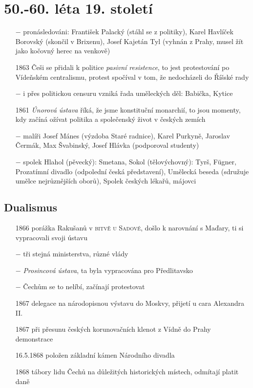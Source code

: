 \documentclass{article}
\begin{document}
\section*{50.-60. léta 19. století}
\begin{itemize}
    \vspace{-0.5em}
    \setlength\itemsep{0.15em}
    \item[$-$] pronásledováni: František Palacký (stáhl se z politiky), Karel Havlíček Borovský (skončil v Brixenu), Josef Kajetán Tyl (vyhnán z Prahy, musel žít jako kočovný herec na venkově)
    \item[1863] Češi se přidali k politice \textit{pasivní resistence}, to jest protestování po Vídeňském centralismu, protest spočíval v tom, že nedocházeli do Říšské rady
    \item[$-$] i přes politickou censuru vzniká řada uměleckých děl: Babička, Kytice
    \item[1861] \textit{Únorová ústava} říká, že jsme konstituční monarchií, to jsou momenty, kdy začíná ožívat politika a společenský život v českých zemích
    \item[$-$] malíři Josef Mánes (výzdoba Staré radnice), Karel Purkyně, Jaroslav Čermák, Max Švabinský, Josef Hlávka (podporoval studenty)
    \item[$-$] spolek Hlahol (pěvecký): Smetana, Sokol (tělovýchovný): Tyrš, Fügner, Prozatímní divadlo (odpolední česká představení), Umělecká beseda (sdružuje umělce nejrůznějších oborů), Spolek českých lékařů, májovci
\end{itemize}

\subsection*{Dualismus}
\begin{itemize}
    \vspace{-0.5em}
    \setlength\itemsep{0.15em}
    \item[1866] porážka Rakušanů v \textsc{bitvě u Sadové}, došlo k narovnání s Maďary, ti si vypracovali svoji ústavu
    \item[$-$] tři stejná ministerstva, různé vlády
    \item[$-$] \textit{Prosincová ústava}, ta byla vypracována pro Předlitavsko
    \item[$-$] Čechům se to nelíbí, začínají protestovat
    \item[1867] delegace na národopisnou výstavu do Moskvy, přijetí u cara Alexandra II.
    \item[1867] při přesunu českých korunovačních klenot z Vídně do Prahy demonstrace
    \item[16.5.1868] položen základní kámen Národního divadla
    \item[1868] tábory lidu Čechů na důležitých historických místech, odmítají platit daně  
\end{itemize}
\end{document}
